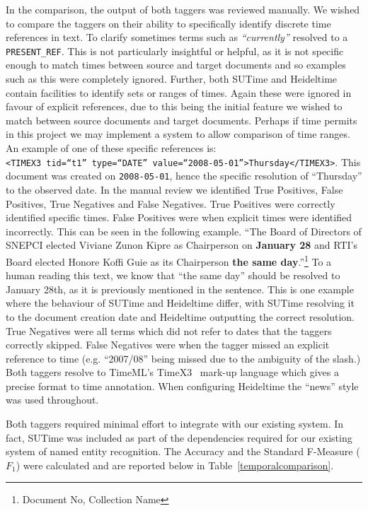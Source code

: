 \documentclass{mprop}
\newcommand{\code}[1]{\texttt{#1}}
\let\oldcite=\cite
\renewcommand\cite[1]{\ifthenelse{\equal{#1}{NEEDED}}{\ensuremath{^\texttt{[citation~needed]}}}{\oldcite{#1}}}
\begin{document}
In the comparison, the output of both taggers was reviewed manually. We wished to compare the taggers on their ability to specifically identify discrete time references in text. 
To clarify sometimes terms such as \textit{``currently''} resolved to a \code{PRESENT\_REF}. 
This is not particularly insightful or helpful, as it is not specific enough to match times between source and target documents and so examples such as this were completely ignored. 
Further, both SUTime and Heideltime contain facilities to identify sets or ranges of times. 
Again these were ignored in favour of explicit references, due to this being the initial feature we wished to match between source documents and target documents. 
Perhaps if time permits in this project we may implement a system to allow comparison of time ranges. 
An example of one of these specific references is: 
\\ \code{<TIMEX3 tid=``t1'' type=``DATE'' value=``2008-05-01''>Thursday</TIMEX3>}.
This document was created on \code{2008-05-01}, hence the specific resolution of ``Thursday'' to the observed date.
In the manual review we identified True Positives, False Positives, True Negatives and False Negatives. True Positives were correctly identified specific times. False Positives were when explicit times were identified incorrectly. This can be seen in the following example. ``The Board of Directors of SNEPCI elected Viviane Zunon Kipre as Chairperson on \textbf{January 28} and RTI's Board elected Honore Koffi Guie as its Chairperson \textbf{the same day}.''\footnote{Document No, Collection Name} To a human reading this text, we know that ``the same day'' should be resolved to January 28th, as it is previously mentioned in the sentence. This is one example where the behaviour of SUTime and Heideltime differ, with SUTime resolving it to the document creation date and Heideltime outputting the correct resolution. True Negatives were all terms which did not refer to dates that the taggers correctly skipped. False Negatives were when the tagger missed an explicit reference to time (e.g. ``2007/08'' being missed due to the ambiguity of the slash.)
Both taggers resolve to TimeML's TimeX3~\cite{timeml} mark-up language which gives a precise format to time annotation.
When configuring Heideltime the ``news'' style was used throughout.

Both taggers required minimal effort to integrate with our existing system. In fact, SUTime was included as part of the dependencies required for our existing system of named entity recognition. The Accuracy and the Standard F-Measure (\textbf{$ F_1 $}) were calculated and are reported below in Table~\ref{temporalcomparison}.
\end{document}
